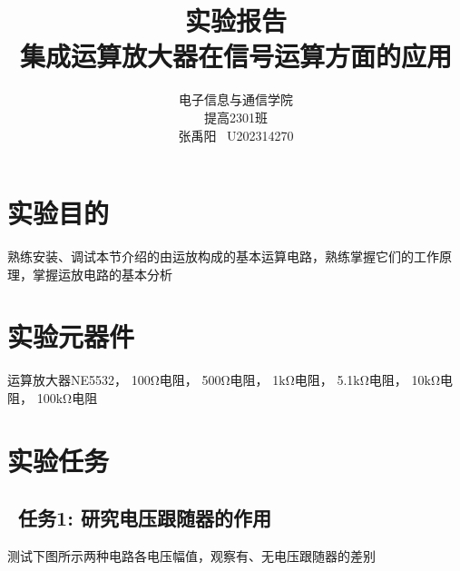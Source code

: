 \documentclass[a4paper,11pt,UTF8]{article}
\begin{document}
	
\title{\huge 实验报告 \\ 集成运算放大器在信号运算方面的应用}
\author{电子信息与通信学院 \\ 提高2301班 \\ 张禹阳 \ U202314270}

\maketitle

\begin{figure}[H]
	\centering
\end{figure}

\tableofcontents

\section{实验目的}
熟练安装、调试本节介绍的由运放构成的基本运算电路，熟练掌握它们的工作原理，掌握运放电路的基本分析

\section{实验元器件}
运算放大器NE5532，
100$\mathrm{\Omega}$电阻，
500$\mathrm{\Omega}$电阻，
1$\mathrm{k\Omega}$电阻，
5.1$\mathrm{k\Omega}$电阻，
10$\mathrm{k\Omega}$电阻，
100$\mathrm{k\Omega}$电阻

\section{实验任务}

\subsection{ \ 任务1: 研究电压跟随器的作用}
测试下图所示两种电路各电压幅值，观察有、无电压跟随器的差别
\end{document}
